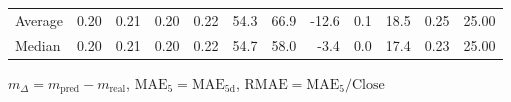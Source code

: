\begin{threeparttable}
{\begin{tabular}{lrrrrrrrrrrr}
Average &          0.20 &          0.21 &          0.20 &        0.22 &                54.3 &                66.9 &      -12.6 &                 0.1 &             18.5 &            0.25 &                  25.00 \\
 Median &          0.20 &          0.21 &          0.20 &        0.22 &                54.7 &                58.0 &       -3.4 &                 0.0 &             17.4 &            0.23 &                  25.00 \\
\bottomrule
\end{tabular}
}
\begin{tablenotes}\footnotesize
\item $m_\Delta=m_{\text{pred}}-m_{\text{real}}$,
$\mathrm{MAE}_5=\mathrm{MAE}_{5\text{d}}$,
$\mathrm{RMAE}=\mathrm{MAE}_5/\text{Close}$
\end{tablenotes}
\end{threeparttable}
\endgroup

